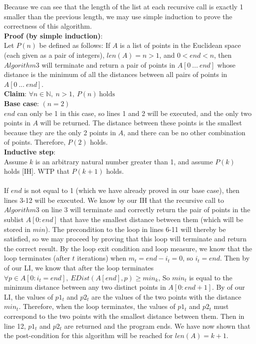 \documentclass{article}
\newcommand{\N}{\mathbb{N}}
\DeclareRobustCommand*\circled[1]{\tikz[baseline =(char.base)]{\node[shape=circle, draw, inner sep = 2pt] (char) {#1};}}
\begin{document}
\begin{enumerate}
	Because we can see that the length of the list at each recursive call is exactly 1 smaller than the previous length, we may use simple induction to prove the correctness of this algorithm. \\
	
	\textbf{Proof (by simple induction)}: \\
	Let $P(n)$ be defined as follows: If $A$ is a list of points in the Euclidean space (each given as a pair of integers), $len(A) = n > 1$, and $0 < end < n$, then $Algorithm3$ will terminate and return a pair of points in $A[0\ ...\ end]$ whose distance is the minimum of all the distances between all pairs of points in $A[0\ ...\ end]$. \\
	
	\textbf{Claim}: $\forall n \in \N,\ n > 1,\ P(n)\ \textrm{holds}$ \\
	
	\textbf{Base case}: $(n = 2)$ \\
	$end$ can only be 1 in this case, so lines 1 and 2 will be executed, and the only two points in $A$ will be returned. The distance between these points is the smallest because they are the only 2 points in $A$, and there can be no other combination of points. Therefore, $P(2)$ holds. \\
	
	\textbf{Inductive step}: \\
	Assume $k$ is an arbitrary natural number greater than 1, and assume $P(k)$ holds [IH]. WTP that $P(k+1)$ holds. \\\\
	If $end$ is not equal to 1 (which we have already proved in our base case), then lines 3-12 will be executed. We know by our IH that the recursive call to $Algorithm3$ on line 3 will terminate and correctly return the pair of points in the sublist $A[0:end]$ that have the smallest distance between them (which will be stored in $min$). The precondition to the loop in lines 6-11 will thereby be satisfied, so we may proceed by proving that this loop will terminate and return the correct result. By the loop exit condition and loop measure, we know that the loop terminates (after $t$ iterations) when $m_t = end - i_t = 0$, so $i_t = end$. Then by \circled{2} of our LI, we know that after the loop terminates $\forall p \in A[0:i_t = end],\ EDist(A[end],p) \geq min_k$, So $min_t$ is equal to the minimum distance between any two distinct points in $A[0:end+1]$. By \circled{3} of our LI, the values of $p1_t$ and $p2_t$ are the values of the two points with the distance $min_t$. Therefore, when the loop terminates, the values of $p1_t$ and $p2_t$ must correspond to the two points with the smallest distance between them. Then in line 12, $p1_t$ and $p2_t$ are returned and the program ends. We have now shown that the post-condition for this algorithm will be reached for $len(A) = k+1$. \\
	

\end{enumerate}
\end{document}
